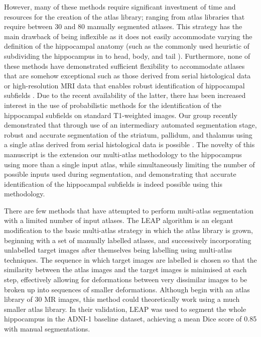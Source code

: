 \documentclass{article}\usepackage{graphicx, color}
\begin{document}
However, many of these methods require significant investment of time and
resources for the creation of the atlas library; ranging from atlas libraries
that require between 30 \citep{Heckemann2006} and 80 \citep{Collins2010}
manually segmented atlases.  This strategy has the main drawback of being
inflexible as it does not easily accommodate varying the definition of the
hippocampal anatomy (such as the commonly used heuristic of subdividing the
hippocampus in to head, body, and tail \citep{Poppenk2011,Pruessner2000}).
Furthermore, none of these methods have demonstrated sufficient flexibility to
accommodate atlases that are somehow exceptional such as those derived from
serial histological data \citep{Chakravarty2006,Yelnik2007} or high-resolution MRI
data that enables robust identification of hippocampal subfields
\citep{Winterburn2013,Yushkevich2009,Mueller2009,VanLeemput2009,Wisse2012}.  Due to
the recent availability of the latter, there has been increased interest in the
use of probabilistic methods for the identification of the hippocampal subfields
on standard T1-weighted images.  Our group recently demonstrated that through
use of an intermediary automated segmentation stage, robust and accurate
segmentation of the striatum, pallidum, and thalamus using a single atlas
derived from serial histological data is possible \citep{MallarChakravarty2012}.
The novelty of this manuscript is the extension our multi-atlas methodology to
the hippocampus using more than a single input atlas, while simultaneously
limiting the number of possible inputs used during segmentation, and
demonstrating that accurate identification of the hippocampal subfields is
indeed possible using this methodology.

There are few methods that have attempted to perform multi-atlas segmentation
with a limited number of input atlases. The LEAP algorithm is an elegant
modification to the basic multi-atlas strategy \citep{Wolz2010} in which the
atlas library is grown, beginning with a set of manually labelled atlases, and
successively incorporating unlabelled target images after themselves being
labelling using multi-atlas techniques. The sequence in which target images are
labelled is chosen so that the similarity between the atlas images and the
target images is minimised at each step, effectively allowing for deformations
between very dissimilar images to be broken up into sequences of smaller
deformations.  Although \citet{Wolz2010} begin with an atlas library of 30 MR
images, this method could theoretically work using a much smaller atlas library.
In their validation, LEAP was used to segment the whole hippocampus in the
ADNI-1 baseline dataset, achieving a mean Dice score of 0.85 with manual
segmentations.
\end{document}
